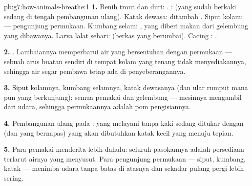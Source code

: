 \begin{solution}{pb:g7:how-animals-breathe:1}
\textbf{1.} Benih  trout dan  duri: . : 
(yang sudah berkaki sedang di tengah pembangunan ulang). Katak dewasa:
 ditambah . Siput kolam:  --- pengunjung
permukaan. Kumbang selam: , yang diberi makan dari gelembung
yang dibawanya. Larva lalat sehari:  (berkas yang berumbai).
Cacing : .

\textbf{2.} . Lambaiannya memperbarui air yang bersentuhan
dengan permukaan  --- sebuah arus buatan sendiri di tempat
kolam yang tenang tidak menyediakannya, sehingga air segar pembawa
 tetap ada di penyeberangannya.

\textbf{3.} Siput kolamnya, kumbang selamnya, katak dewasanya (dan
ular rumput mana pun yang berkunjung): semua pemakai  dan
gelembung --- mesinnya mengambil  dari udara, sehingga
permukaannya adalah pom pengisiannya.

\textbf{4.} Pembangunan ulang  pada : 
yang melayani  tanpa kaki sedang ditukar dengan  (dan
 yang bernapas) yang akan dibutuhkan katak kecil yang menuju
tepian.

\textbf{5.} Para pemakai  menderita lebih dahulu: seluruh
pasokannya adalah persediaan terlarut airnya yang menyusut. Para
pengunjung permukaan --- siput, kumbang, katak --- menimba udara tanpa
batas di atasnya dan sekadar pulang pergi lebih sering.


\end{solution}
